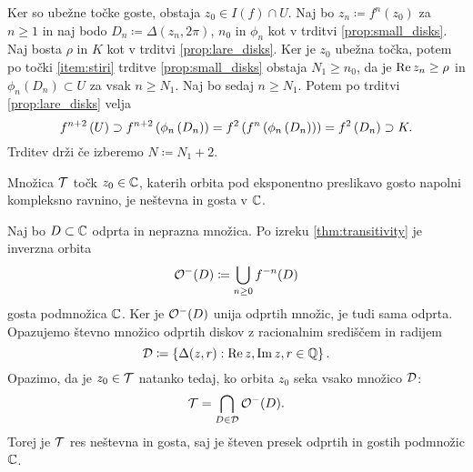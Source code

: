 \begin{dokaz}
    Ker so ubežne točke goste, obstaja \(z_0 \in I (f) \cap U\). Naj bo \(z_n \coloneq f^n (z_0)\) za \(n \geq 1\) in naj bodo \(D_n \coloneq \Delta (z_n, 2 \pi)\), \(n_0\) in \(\phi_n\) kot v trditvi \ref{prop:small_disks}. Naj bosta \(\rho\) in \(K\) kot v trditvi \ref{prop:lare_disks}. Ker je \(z_0\) ubežna točka, potem po točki \ref{item:stiri} trditve \ref{prop:small_disks} obstaja \(N_1 \geq n_0\), da je \(\operatorname{Re} z_n \geq \rho\) in \(\phi_n (D_n) \subset U\) za vsak \(n \geq N_1\). Naj bo sedaj \(n \geq N_1\). Potem po trditvi \ref{prop:lare_disks} velja
    \[f^{n + 2} \left( U \right) \supset f^{n + 2} \left( \phi_n \left( D_n \right) \right) = f^2 \left( f^n \left( \phi_n \left( D_n \right) \right) \right) = f^2 \left( D_n \right) \supset K.\]
    Trditev drži če izberemo \(N \coloneq N_1 + 2\).
\end{dokaz}

\begin{posledica}
    Množica \(\mathcal T\) točk \(z_0 \in \mathbb C\), katerih orbita pod eksponentno preslikavo gosto napolni kompleksno ravnino, je neštevna in gosta v \(\mathbb C\).
\end{posledica}

\begin{dokaz}
    Naj bo \(D \subset \mathbb C\) odprta in neprazna množica. Po izreku \ref{thm:transitivity} je inverzna orbita
    \[\mathcal O^- (D) \coloneq \bigcup_{n \geq 0} f^{- n} (D)\]
    gosta podmnožica \(\mathbb C\). Ker je \(\mathcal O^- (D)\) unija odprtih množic, je tudi sama odprta. Opazujemo števno množico odprtih diskov z racionalnim središčem in radijem
    \[\mathcal D \coloneq \left\{ \Delta (z, r) : \operatorname{Re} z, \operatorname{Im} z, r \in \mathbb Q \right\}.\]
    Opazimo, da je \(z_0 \in \mathcal T\) natanko tedaj, ko orbita \(z_0\) seka vsako množico \(\mathcal D\):
    \[\mathcal T = \bigcap_{D \in \mathcal D} \mathcal O^- (D).\]
    Torej je \(\mathcal T\) res neštevna in gosta, saj je števen presek odprtih in gostih podmnožic \(\mathbb C\).
\end{dokaz}